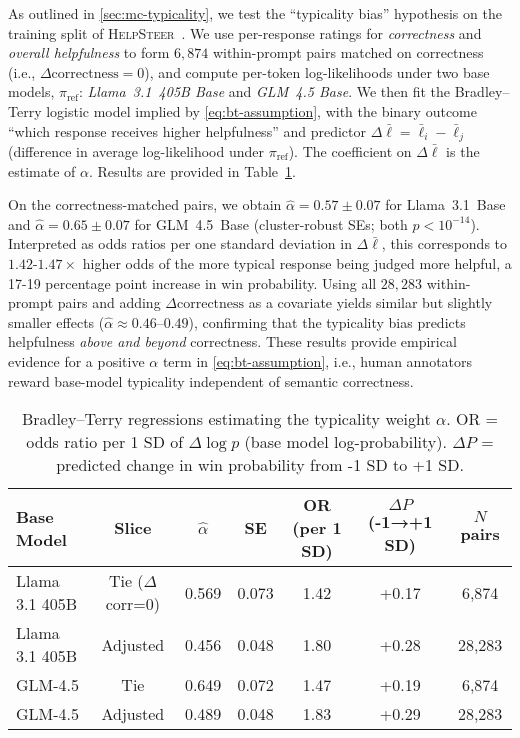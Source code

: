 As outlined in \cref{sec:mc-typicality}, we test the ``typicality bias'' hypothesis on the training split of \textsc{HelpSteer}~\citep{wang2023helpsteer}. We use per-response ratings for \emph{correctness} and \emph{overall helpfulness} to form $6{,}874$ within-prompt pairs matched on correctness (i.e., $\Delta\text{correctness}=0$), and compute per-token log-likelihoods under two base models, $\pi_{\text{ref}}$: \emph{Llama~3.1~405B Base} and \emph{GLM~4.5 Base}. We then fit the Bradley–Terry logistic model implied by \eqref{eq:bt-assumption}, with the binary outcome ``which response receives higher helpfulness'' and predictor $\Delta\bar{\ell}=\bar{\ell}_i-\bar{\ell}_j$ (difference in average log-likelihood under $\pi_{\text{ref}}$). The coefficient on $\Delta\bar{\ell}$ is the estimate of $\alpha$. Results are provided in Table~\ref{tab:mc-alpha}.



On the correctness-matched pairs, we obtain $\hat{\alpha}=0.57\pm0.07$ for Llama~3.1~Base and $\hat{\alpha}=0.65\pm0.07$ for GLM~4.5~Base (cluster-robust SEs; both $p<10^{-14}$). Interpreted as odds ratios per one standard deviation in $\Delta\bar{\ell}$, this corresponds to $1.42$-$1.47\times$ higher odds of the more typical response being judged more helpful, a 17-19 percentage point increase in win probability. Using all $28{,}283$ within-prompt pairs and adding $\Delta\text{correctness}$ as a covariate yields similar but slightly smaller effects ($\hat{\alpha}\approx0.46$–$0.49$), confirming that the typicality bias predicts helpfulness \emph{above and beyond} correctness. These results provide empirical evidence for a positive $\alpha$ term in \eqref{eq:bt-assumption}, i.e., human annotators reward base-model typicality independent of semantic correctness.

\begin{table}[htbp!]
\centering
\small
\caption{Bradley–Terry regressions estimating the typicality weight $\alpha$. OR = odds ratio per 1 SD of $\Delta\log p$ (base model log-probability). $\Delta P$ = predicted change in win probability from -1 SD to +1 SD.}
\begin{tabular}{lcccccc}
\toprule
Base Model & Slice & $\hat\alpha$ & SE & OR (per 1 SD) & $\Delta P$ (-1→+1 SD) & $N$ pairs \\
\midrule
Llama 3.1 405B & Tie ($\Delta$corr=0) & 0.569 & 0.073 & 1.42 & +0.17 & 6{,}874 \\
Llama 3.1 405B & Adjusted             & 0.456 & 0.048 & 1.80 & +0.28 & 28{,}283 \\
GLM-4.5 & Tie                 & 0.649 & 0.072 & 1.47 & +0.19 & 6{,}874 \\
GLM-4.5 & Adjusted             & 0.489 & 0.048 & 1.83 & +0.29 & 28{,}283 \\
\bottomrule
\end{tabular}
\label{tab:mc-alpha}
\end{table}

